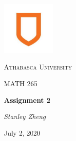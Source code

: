 \documentclass[11pt, letterpaper, twoside]{article}
\begin{document}
\begin{titlepage}
	\centering
	\vspace*{60px}
	\hspace{0pt}
	\includegraphics[width=0.2\textwidth]{logo}\par\vspace{1cm}
	{\scshape\LARGE Athabasca University \par}
	\vspace{1cm}
	{\scshape\Large MATH 265\par}
	\vspace{1.5cm}
	{\huge\bfseries Assignment 2\par}
	\vspace{2cm}
	{\Large\itshape Stanley Zheng\par}
	\vfill
	{\large July 2, 2020\par}
	\vspace*{50px}
	\hspace{0pt}
\pagebreak
\end{titlepage}
\end{document}
